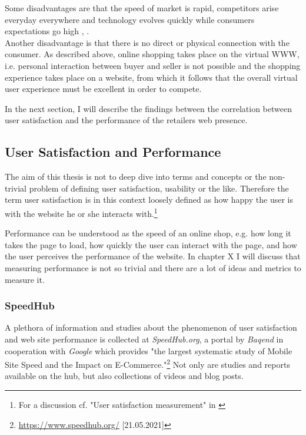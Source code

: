 Some disadvantages are that the speed of market is rapid, competitors arise everyday everywhere and technology evolves quickly while consumers expectations go high \cite{2019Hermogeno}, \cite{2020Lang}.
\\

Another disadvantage is that there is no direct or physical connection with the consumer.
As described above, online shopping takes place on the virtual WWW, i.e. personal interaction between buyer and seller is not possible and the shopping experience takes place on a website, from which it follows that the overall virtual user experience must be excellent in order to compete.

In the next section, I will describe the findings between the correlation between user satisfaction and the performance of the retailers web presence.





\subsection{User Satisfaction and Performance}
\label{chapter:user_satisfaction}

The aim of this thesis is not to deep dive into terms and concepts or the non-trivial problem of defining user satisfaction, usability or the like.
Therefore the term user satisfaction is in this context loosely defined as how happy the user is with the website he or she interacts with.\footnote{For a discussion cf. "User satisfaction measurement" in \cite{2010Islam}}

Performance can be understood as the speed of an online shop, e.g. how long it takes the page to load, how quickly the user can interact with the page, and how the user perceives the performance of the website.
In chapter X I will discuss that measuring performance is not so trivial and there are a lot of ideas and metrics to measure it. %


\subsubsection{SpeedHub}

A plethora of information and studies about the phenomenon of user satisfaction and web site performance is collected at \textit{SpeedHub.org}, a portal by \textit{Baqend} in cooperation with \textit{Google} which provides "the largest systematic study of Mobile Site Speed and the Impact on E-Commerce."\footnote{\url{https://www.speedhub.org/} [21.05.2021]}
Not only are studies and reports available on the hub, but also collections of videos and blog posts.

